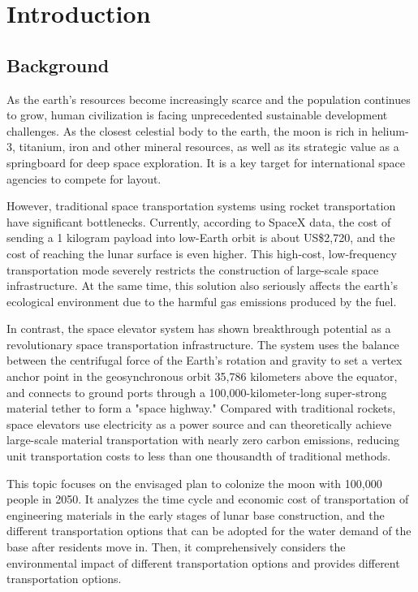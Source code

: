 \section{Introduction}
\setlength{\parindent}{2em}
\subsection{Background} %
\indent As the earth's resources become increasingly scarce and the population continues to grow, human civilization is facing unprecedented sustainable development challenges. As the closest celestial body to the earth, the moon is rich in helium-3, titanium, iron and other mineral resources, as well as its strategic value as a springboard for deep space exploration. It is a key target for international space agencies to compete for layout.

\indent However, traditional space transportation systems using rocket transportation have significant bottlenecks. Currently, according to SpaceX data, the cost of sending a 1 kilogram payload into low-Earth orbit is about US\$2,720, and the cost of reaching the lunar surface is even higher. This high-cost, low-frequency transportation mode severely restricts the construction of large-scale space infrastructure. At the same time, this solution also seriously affects the earth's ecological environment due to the harmful gas emissions produced by the fuel.

\indent In contrast, the space elevator system has shown breakthrough potential as a revolutionary space transportation infrastructure. The system uses the balance between the centrifugal force of the Earth's rotation and gravity to set a vertex anchor point in the geosynchronous orbit 35,786 kilometers above the equator, and connects to ground ports through a 100,000-kilometer-long super-strong material tether to form a "space highway." Compared with traditional rockets, space elevators use electricity as a power source and can theoretically achieve large-scale material transportation with nearly zero carbon emissions, reducing unit transportation costs to less than one thousandth of traditional methods.

\indent This topic focuses on the envisaged plan to colonize the moon with 100,000 people in 2050. It analyzes the time cycle and economic cost of transportation of engineering materials in the early stages of lunar base construction, and the different transportation options that can be adopted for the water demand of the base after residents move in. Then, it comprehensively considers the environmental impact of different transportation options and provides different transportation options.

